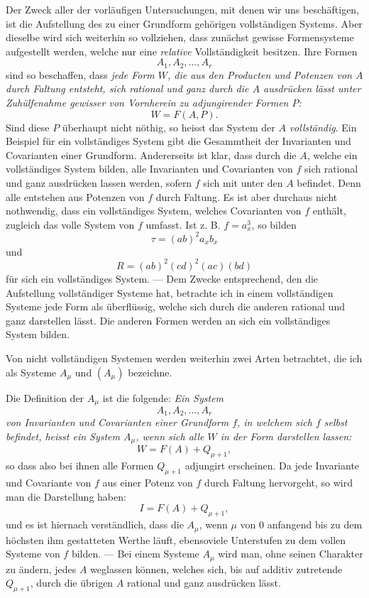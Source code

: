 \documentclass[10pt]{article}
\begin{document}
Der Zweck aller der vorläufigen Untersuchungen, mit denen wir uns beschäftigen, ist die Aufstellung des zu einer Grundform gehörigen vollständigen Systems. Aber dieselbe wird sich weiterhin so vollziehen, dass zunächst gewisse Formensysteme aufgestellt werden, welche nur eine \emph{relative} Vollständigkeit besitzen. Ihre Formen
\[
A_1,A_2,\ldots,A_r
\]
sind so beschaffen, dass \emph{jede Form $W$, die aus den Producten und Potenzen von $A$ durch Faltung entsteht, sich rational und ganz durch die $A$ ausdrücken lässt unter Zuhülfenahme gewisser von Vornherein zu adjungirender Formen $P$:}
\[
W=F(A,P).
\]
Sind diese $P$ überhaupt nicht nöthig, so heisst das System der $A$ \emph{vollständig}. Ein Beispiel für ein vollständiges System gibt die Gesammtheit der Invarianten und Covarianten einer Grundform. Andererseits ist klar, dass durch die $A$, welche ein vollständiges System bilden, alle Invarianten und Covarianten von $f$ sich rational und ganz ausdrücken lassen werden, sofern $f$ sich mit unter den $A$ befindet. Denn alle entstehen aus Potenzen von $f$ durch Faltung. Es ist aber durchaus nicht nothwendig, dass ein vollständiges System, welches Covarianten von $f$ enthält, zugleich das volle System von $f$ umfasst. Ist z. B. $f=a_x^3$, so bilden
\[
\tau=(ab)^2a_xb_x
\]
und
\[
R=(ab)^2(cd)^2(ac)(bd)
\]
für sich ein vollständiges System. --- Dem Zwecke entsprechend, den die Aufstellung vollständiger Systeme hat, betrachte ich in einem vollständigen Systeme jede Form als überflüssig, welche sich durch die anderen rational und ganz darstellen lässt. Die anderen Formen werden an sich ein vollständiges System bilden.

Von nicht vollständigen Systemen werden weiterhin zwei Arten betrachtet, die ich als Systeme $A_\mu$ und $(A_\mu)$ bezeichne.

Die Definition der $A_\mu$ ist die folgende: \emph{Ein System}
\[
A_1,A_2,\ldots,A_r
\]
\emph{von Invarianten und Covarianten einer Grundform $f$, in welchem sich $f$ selbst befindet, heisst ein System $A_\mu$, wenn sich alle $W$ in der Form darstellen lassen:}
\[
W=F(A)+Q_{\mu+1},
\]
so dass also bei ihnen alle Formen $Q_{\mu+1}$ adjungirt erscheinen. Da jede Invariante und Covariante von $f$ aus einer Potenz von $f$ durch Faltung hervorgeht, so wird man die Darstellung haben:
\[
I=F(A)+Q_{\mu+1},
\]
und es ist hiernach verständlich, dass die $A_\mu$, wenn $\mu$ von 0 anfangend bis zu dem höchsten ihm gestatteten Werthe läuft, ebensoviele Unterstufen zu dem vollen Systeme von $f$ bilden. --- Bei einem Systeme $A_\mu$ wird man, ohne seinen Charakter zu ändern, jedes $A$ weglassen können, welches sich, bis auf additiv zutretende $Q_{\mu+1}$, durch die übrigen $A$ rational und ganz ausdrücken lässt.
\end{document}
